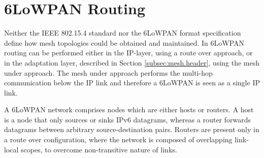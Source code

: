 \chapter{6LoWPAN Routing}\label{ch:routing}
Neither the IEEE 802.15.4 \cite{ieee802.15.4} standard nor the 6LoWPAN format specification \cite{rfc4944} define how mesh topologies could be obtained and maintained. In 6LoWPAN routing can be performed either in the IP-layer, using a route over approach, or in the adaptation layer, described in Section \ref{subsec:mesh.header}, using the mesh under approach. The mesh under approach performs the multi-hop communication below the IP link and therefore a 6LoWPAN is seen as a single IP link. 

A 6LoWPAN network comprises nodes which are either hosts or routers. A host is a node that only sources or sinks IPv6 datagrams, whereas a router forwards datagrams between arbitrary source-destination pairs. Routers are present only in a route over configuration, where the network is composed of overlapping link-local scopes, to overcome non-transitive nature of links. 
